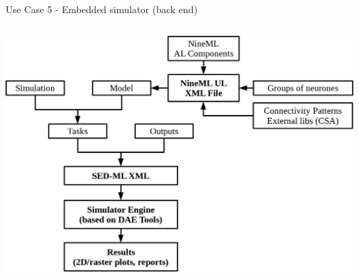 \documentclass[compress,newPxFont,sthlmFooter]{beamer}
\begin{document}
\begin{frame}[plain]{Use Case 5 - Embedded simulator (back end)}
\begin{columns}[c]
      \begin{column}{0.45\paperwidth}
        \begin{center}
            \includegraphics[align=c, width=\textwidth]{nineml_ris.png}
        \end{center}
      \end{column}
    \end{columns}
\end{frame}
\end{document}
